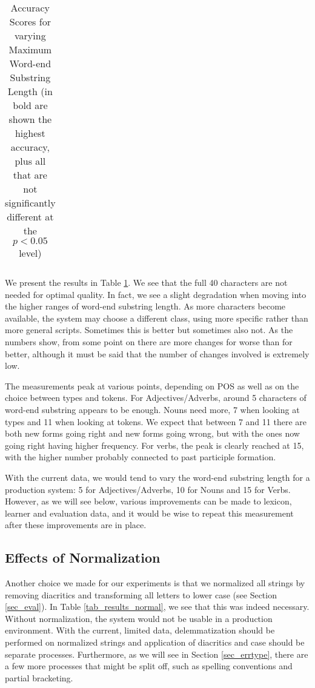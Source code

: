 \documentclass[a4paper,10pt,twoside]{article}
\begin{document}
\begin{table}[tbh]
\begin{center}
\begin{tabular}{|c|ccc|ccc|}
\hline
\end{tabular}
\caption{Accuracy Scores for varying Maximum Word-end Substring Length (in bold are shown the highest accuracy, plus all that are not significantly different at the $p<0.05$ level)}
\label{tab_results_suflen}
\end{center}
\end{table}



We present the results in Table \ref{tab_results_suflen}. We see that the full 40 characters are not needed for optimal quality. In fact, we see a slight degradation when moving into the higher ranges of word-end substring length. As more characters become available, the system may choose a different class, using more specific rather than more general scripts. Sometimes this is better but sometimes also not. As the numbers show, from some point on there are more changes for worse than for better, although it must be said that the number of changes involved is extremely low. 

The measurements peak at various points, depending on POS as well as on the choice between types and tokens. For Adjectives/Adverbs, around 5 characters of word-end substring appears to be enough. Nouns need more, 7 when looking at types and 11 when looking at tokens. We expect that between 7 and 11 there are both new forms going right and new forms going wrong, but with the ones now going right having higher frequency. For verbs, the peak is clearly reached at 15, with the higher number probably connected to past participle formation.

With the current data, we would tend to vary the word-end substring length for a production system: 5 for Adjectives/Adverbs, 10 for Nouns and 15 for Verbs. However, as we will see below, various improvements can be made to lexicon, learner and evaluation data, and it would be wise to repeat this measurement after these improvements are in place.



\subsection{Effects of Normalization}
\label{sec_settings_normal}
\label{sec_settings_norm}
Another choice we made for our experiments is that we normalized all strings by removing diacritics and transforming all letters to lower case (see Section \ref{sec_eval}). In Table \ref{tab_results_normal}, we see that this was indeed necessary. Without normalization, the system would not be usable in a production environment. With the current, limited data, delemmatization should be performed on normalized strings and application of diacritics and case should be separate processes. Furthermore, as we will see in Section \ref{sec_errtype}, there are a few more processes that might be split off, such as spelling conventions and partial bracketing.
\end{document}

